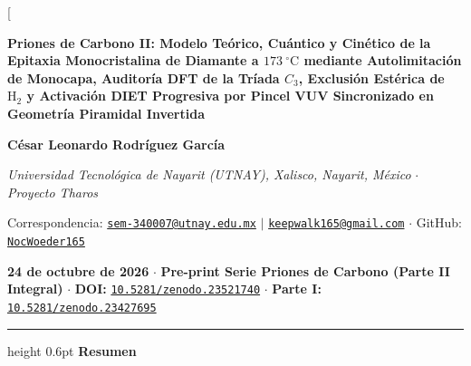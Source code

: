 \documentclass[10pt,twocolumn,a4paper]{article}
\begin{document}
\twocolumn[
  \begin{@twocolumnfalse}
    \vspace{-0.65cm}
    {\centering
      {\Large \textbf{Priones de Carbono II: Modelo Teórico, Cuántico y Cinético de la Epitaxia Monocristalina de Diamante a $173\ ^\circ\text{C}$ mediante Autolimitación de Monocapa, Auditoría DFT de la Tríada $C_3$, Exclusión Estérica de $\text{H}_2$ y Activación DIET Progresiva por Pincel VUV Sincronizado en Geometría Piramidal Invertida} \par}
      \vspace{0.50em}
      {\normalsize \textbf{César Leonardo Rodríguez García} \par}
      \vspace{0.18em}
      {\footnotesize \textit{Universidad Tecnológica de Nayarit (UTNAY), Xalisco, Nayarit, México} $\cdot$ \textit{Proyecto Tharos} \par}
      \vspace{0.15em}
      {\footnotesize Correspondencia: \href{mailto:sem-340007@utnay.edu.mx}{\texttt{sem-340007@utnay.edu.mx}} $\mid$ \href{mailto:keepwalk165@gmail.com}{\texttt{keepwalk165@gmail.com}} $\cdot$ GitHub: \href{https://github.com/NocWoeder165}{\texttt{NocWoeder165}} \par}
      \vspace{0.18em}
      {\footnotesize \textbf{24 de octubre de 2026} $\cdot$ \textbf{Pre-print Serie Priones de Carbono (Parte II Integral)} $\cdot$ \textbf{DOI:} \href{https://doi.org/10.5281/zenodo.23521740}{\texttt{10.5281/zenodo.23521740}} $\cdot$ \textbf{Parte I:} \href{https://doi.org/10.5281/zenodo.23427695}{\texttt{10.5281/zenodo.23427695}} \par}
      \vspace{0.40em}
    }
    \hrule height 0.6pt
    \vspace{0.35em}
    \noindent\textbf{\normalsize Resumen}
    \vspace{0.20em}


\end{@twocolumnfalse}
\end{document}
